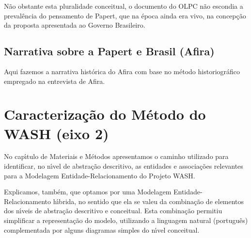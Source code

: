 \documentclass[
12pt,		%
openright,	%
twoside,  %
a4paper,			%
chapter=TITLE,		%
english,			%
french,				%
spanish,			%
brazil				%
]{USPSC-classe/USPSC}
\begin{document}
N\~ao obstante esta pluralidade conceitual, o documento do OLPC n\~ao escondia a preval\^encia do pensamento de Papert, que na \'epoca ainda era vivo, na concep\c{c}\~ao da proposta apresentada ao Governo Brasileiro.














\subsection[Narrativa sobre a Papert e Brasil (Afira)]{Narrativa sobre a Papert e Brasil (Afira)}\label{Narrativa sobre a Papert e Brasil (Afira)}
Aqui fazemos a narrativa hist\'orica do Afira com base no m\'etodo historiogr\'afico empregado na entrevista de Afira.














\section[Caracteriza\c{c}\~ao do M\'etodo do WASH (eixo 2)]{Caracteriza\c{c}\~ao do M\'etodo do WASH (eixo 2)}\label{Caracteriza\c{c}\~ao do M\'etodo do WASH (eixo 2)}
No cap\'{\i}tulo de Materiais e M\'etodos apresentamos o caminho utilizado para identificar, no n\'{\i}vel de abstra\c{c}\~ao descritivo, as entidades e associa\c{c}\~oes relevantes para a Modelagem Entidade-Relacionamento do Projeto WASH.














Explicamos, tamb\'em, que optamos por uma Modelagem Entidade-Relacionamento h\'{\i}brida, no sentido que ela se valeu da combina\c{c}\~ao de elementos dos n\'{\i}veis de abstra\c{c}\~ao descritivo e conceitual. Esta combina\c{c}\~ao permitiu simplificar a representa\c{c}\~ao do modelo, utilizando a linguagem natural (portugu\^es) complementada por alguns diagramas simples do n\'{\i}vel conceitual.
\end{document}
